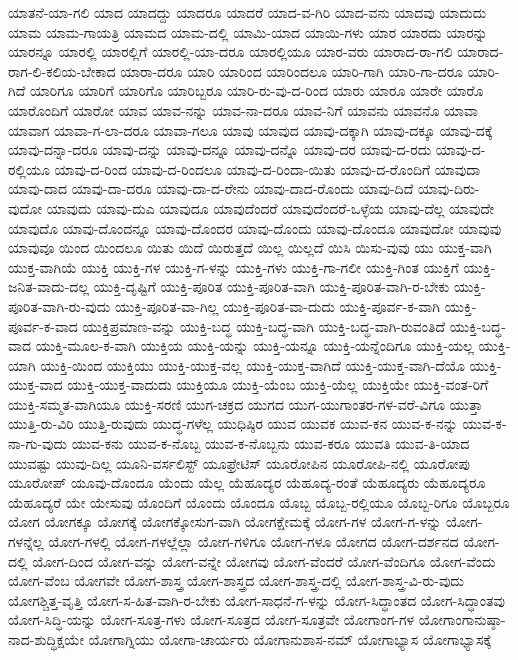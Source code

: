 {ಯಾತನೆ-ಯಾ-ಗಲಿ
ಯಾದ
ಯಾದದ್ದು
ಯಾದರೂ
ಯಾದರೆ
ಯಾದ-ವ-ಗಿರಿ
ಯಾದ-ವನು
ಯಾದವು
ಯಾದುದು
ಯಾಮ
ಯಾಮ-ಗಾಯತ್ರಿ
ಯಾಮದ
ಯಾಮ-ದಲ್ಲಿ
ಯಾಮಿ-ಯಾದ
ಯಾಯಿ-ಗಳು
ಯಾರ
ಯಾರದು
ಯಾರನ್ನು
ಯಾರನ್ನೂ
ಯಾರಲ್ಲಿ
ಯಾರಲ್ಲಿಗೆ
ಯಾರಲ್ಲಿ-ಯಾ-ದರೂ
ಯಾರಲ್ಲಿಯೂ
ಯಾರ-ವರು
ಯಾರಾದ-ರಾ-ಗಲಿ
ಯಾರಾದ-ರಾಗ-ಲಿ-ಕಲಿಯ-ಬೇಕಾದ
ಯಾರಾ-ದರೂ
ಯಾರಿ
ಯಾರಿಂದ
ಯಾರಿಂದಲೂ
ಯಾರಿ-ಗಾಗಿ
ಯಾರಿ-ಗಾ-ದರೂ
ಯಾರಿ-ಗಿದೆ
ಯಾರಿಗೂ
ಯಾರಿಗೆ
ಯಾರಿಗೊ
ಯಾರಿಬ್ಬರೂ
ಯಾರಿ-ರು-ವು-ದ-ರಿಂದ
ಯಾರು
ಯಾರೂ
ಯಾರೇ
ಯಾರೊ
ಯಾರೊಂದಿಗೆ
ಯಾರೋ
ಯಾವ
ಯಾವ-ನನ್ನು
ಯಾವ-ನಾ-ದರೂ
ಯಾವ-ನಿಗೆ
ಯಾವನು
ಯಾವನೊ
ಯಾವಾ
ಯಾವಾಗ
ಯಾವಾ-ಗ-ಲಾ-ದರೂ
ಯಾವಾ-ಗಲೂ
ಯಾವು
ಯಾವುದ
ಯಾವು-ದಕ್ಕಾಗಿ
ಯಾವು-ದಕ್ಕೂ
ಯಾವು-ದಕ್ಕೆ
ಯಾವು-ದನ್ನಾ-ದರೂ
ಯಾವು-ದನ್ನು
ಯಾವು-ದನ್ನೂ
ಯಾವು-ದನ್ನೊ
ಯಾವು-ದರ
ಯಾವು-ದ-ರದು
ಯಾವು-ದ-ರಲ್ಲಿಯೂ
ಯಾವು-ದ-ರಿಂದ
ಯಾವು-ದ-ರಿಂದಲೂ
ಯಾವು-ದ-ರಿಂದಾ-ಯಿತು
ಯಾವು-ದ-ರೊಂದಿಗೆ
ಯಾವುದಾ
ಯಾವು-ದಾದ
ಯಾವು-ದಾ-ದರೂ
ಯಾವು-ದಾ-ದ-ರೇನು
ಯಾವು-ದಾದ-ರೊಂದು
ಯಾವು-ದಿದೆ
ಯಾವು-ದಿರು-ವುದೋ
ಯಾವುದು
ಯಾವು-ದುಎ
ಯಾವುದೂ
ಯಾವುದೆಂದರೆ
ಯಾವುದೆಂದರೆ-ಒಳ್ಳೆಯ
ಯಾವು-ದೆಲ್ಲ
ಯಾವುದೇ
ಯಾವುದೊ
ಯಾವು-ದೊಂದನ್ನೂ
ಯಾವು-ದೊಂದರ
ಯಾವು-ದೊಂದು
ಯಾವು-ದೊಂದೂ
ಯಾವುದೋ
ಯಾವುವು
ಯಾವುವೂ
ಯಿಂದ
ಯಿಂದಲೂ
ಯಿತು
ಯಿದೆ
ಯಿರುತ್ತದೆ
ಯಿಲ್ಲ
ಯಿಲ್ಲದೆ
ಯಿಸಿ
ಯಿಸು-ವುವು
ಯು
ಯುಕ್ತ-ವಾಗಿ
ಯುಕ್ತ-ವಾಗಿಯೆ
ಯುಕ್ತಿ
ಯುಕ್ತಿ-ಗಳ
ಯುಕ್ತಿ-ಗ-ಳನ್ನು
ಯುಕ್ತಿ-ಗಳು
ಯುಕ್ತಿ-ಗಾ-ಗಲೀ
ಯುಕ್ತಿ-ಗಿಂತ
ಯುಕ್ತಿಗೆ
ಯುಕ್ತಿ-ಜನಿತ-ವಾದು-ದಲ್ಲ
ಯುಕ್ತಿ-ದೃಷ್ಟಿಗೆ
ಯುಕ್ತಿ-ಪೂರಿತ
ಯುಕ್ತಿ-ಪೂರಿತ-ವಾಗಿ
ಯುಕ್ತಿ-ಪೂರಿತ-ವಾಗಿ-ರ-ಬೇಕು
ಯುಕ್ತಿ-ಪೂರಿತ-ವಾಗಿ-ರು-ವುದು
ಯುಕ್ತಿ-ಪೂರಿತ-ವಾ-ಗಿಲ್ಲ
ಯುಕ್ತಿ-ಪೂರಿತ-ವಾ-ದುದು
ಯುಕ್ತಿ-ಪೂರ್ವ-ಕ-ವಾಗಿ
ಯುಕ್ತಿ-ಪೂರ್ವ-ಕ-ವಾದ
ಯುಕ್ತಿಪ್ರಮಾಣ-ವನ್ನು
ಯುಕ್ತಿ-ಬದ್ಧ
ಯುಕ್ತಿ-ಬದ್ಧ-ವಾಗಿ
ಯುಕ್ತಿ-ಬದ್ಧ-ವಾಗಿ-ರುವಂತಿದೆ
ಯುಕ್ತಿ-ಬದ್ಧ-ವಾದ
ಯುಕ್ತಿ-ಮೂಲ-ಕ-ವಾಗಿ
ಯುಕ್ತಿಯ
ಯುಕ್ತಿ-ಯನ್ನು
ಯುಕ್ತಿ-ಯನ್ನೂ
ಯುಕ್ತಿ-ಯನ್ನೆಂದಿಗೂ
ಯುಕ್ತಿ-ಯಲ್ಲ
ಯುಕ್ತಿ-ಯಾಗಿ
ಯುಕ್ತಿ-ಯಿಂದ
ಯುಕ್ತಿಯು
ಯುಕ್ತಿ-ಯುಕ್ತ-ವಲ್ಲ
ಯುಕ್ತಿ-ಯುಕ್ತ-ವಾಗಿದೆ
ಯುಕ್ತಿ-ಯುಕ್ತ-ವಾಗಿ-ದೆಯೊ
ಯುಕ್ತಿ-ಯುಕ್ತ-ವಾದ
ಯುಕ್ತಿ-ಯುಕ್ತ-ವಾದುದು
ಯುಕ್ತಿಯೂ
ಯುಕ್ತಿ-ಯೆಂಬ
ಯುಕ್ತಿ-ಯೆಲ್ಲ
ಯುಕ್ತಿಯೇ
ಯುಕ್ತಿ-ವಂತ-ರಿಗೆ
ಯುಕ್ತಿ-ಸಮ್ಮತ-ವಾಗಿಯೂ
ಯುಕ್ತಿ-ಸರಣಿ
ಯುಗ-ಚಕ್ರದ
ಯುಗದ
ಯುಗ-ಯುಗಾಂತರ-ಗಳ-ವರೆ-ವಿಗೂ
ಯುತ್ತಾ
ಯುತ್ತಿ-ರು-ವಿರಿ
ಯುತ್ತಿ-ರುವುದು
ಯುದ್ಧ-ಗಳೆಲ್ಲ
ಯುಧಿಷ್ಠಿರ
ಯುವ
ಯುವಕ
ಯುವ-ಕನ
ಯುವ-ಕ-ನನ್ನು
ಯುವ-ಕ-ನಾ-ಗು-ವುದು
ಯುವ-ಕನು
ಯುವ-ಕ-ನೊಬ್ಬ
ಯುವ-ಕ-ನೊಬ್ಬನು
ಯುವ-ಕರೂ
ಯುವತಿ
ಯುವ-ತಿ-ಯಾದ
ಯುವಷ್ಟು
ಯುವು-ದಿಲ್ಲ
ಯೂನಿ-ವರ್ಸಲಿಸ್ಟ್
ಯೂಫ್ರೇಟಿಸ್
ಯೂರೋಪಿನ
ಯೂರೋಪಿ-ನಲ್ಲಿ
ಯೂರೋಪು
ಯೂರೋಪ್
ಯೂವು-ದೊಂದೂ
ಯೆಂದು
ಯೆಲ್ಲ
ಯೆಹೂದ್ಯರ
ಯೆಹೂದ್ಯ-ರಂತೆ
ಯೆಹೂದ್ಯರು
ಯೆಹೂದ್ಯರೂ
ಯೆಹೂದ್ಯರೆ
ಯೇ
ಯೇಸುವು
ಯೊಂದಿಗೆ
ಯೊಂದು
ಯೊಂದೂ
ಯೊಬ್ಬ
ಯೊಬ್ಬ-ರಲ್ಲಿಯೂ
ಯೊಬ್ಬ-ರಿಗೂ
ಯೊಬ್ಬರೂ
ಯೋಗ
ಯೋಗಕ್ಕೂ
ಯೋಗಕ್ಕೆ
ಯೋಗಕ್ಕೋಸುಗ-ವಾಗಿ
ಯೋಗಕ್ಷೇಮಕ್ಕೆ
ಯೋಗ-ಗಳ
ಯೋಗ-ಗ-ಳನ್ನು
ಯೋಗ-ಗಳನ್ನೆಲ್ಲ
ಯೋಗ-ಗಳಲ್ಲಿ
ಯೋಗ-ಗಳಲ್ಲೆಲ್ಲಾ
ಯೋಗ-ಗಳಿಗೂ
ಯೋಗ-ಗಳೂ
ಯೋಗದ
ಯೋಗ-ದರ್ಶನದ
ಯೋಗ-ದಲ್ಲಿ
ಯೋಗ-ದಿಂದ
ಯೋಗ-ವನ್ನು
ಯೋಗ-ವನ್ನೇ
ಯೋಗವು
ಯೋಗ-ವೆಂದರೆ
ಯೋಗ-ವೆಂದಿಗೂ
ಯೋಗ-ವೆಂದು
ಯೋಗ-ವೆಂಬ
ಯೋಗವೇ
ಯೋಗ-ಶಾಸ್ತ್ರ
ಯೋಗ-ಶಾಸ್ತ್ರದ
ಯೋಗ-ಶಾಸ್ತ್ರ-ದಲ್ಲಿ
ಯೋಗ-ಶಾಸ್ತ್ರ-ವಿ-ರು-ವುದು
ಯೋಗಶ್ಚಿತ್ತ-ವೃತ್ತಿ
ಯೋಗ-ಸ-ಹಿತ-ವಾಗಿ-ರ-ಬೇಕು
ಯೋಗ-ಸಾಧನೆ-ಗ-ಳನ್ನು
ಯೋಗ-ಸಿದ್ಧಾಂತದ
ಯೋಗ-ಸಿದ್ಧಾಂತವು
ಯೋಗ-ಸಿದ್ಧಿ-ಯನ್ನು
ಯೋಗ-ಸೂತ್ರ-ಗಳು
ಯೋಗ-ಸೂತ್ರದ
ಯೋಗ-ಸೂತ್ರವೇ
ಯೋಗಾಂಗ-ಗಳ
ಯೋಗಾಂಗಾನುಷ್ಠಾ-ನಾದ-ಶುದ್ಧಿಕ್ಷಯೇ
ಯೋಗಾಗ್ನಿಯು
ಯೋಗಾ-ಚಾರ್ಯರು
ಯೋಗಾನುಶಾಸ-ನಮ್
ಯೋಗಾಭ್ಯಾಸ
ಯೋಗಾಭ್ಯಾಸಕ್ಕೆ
}
